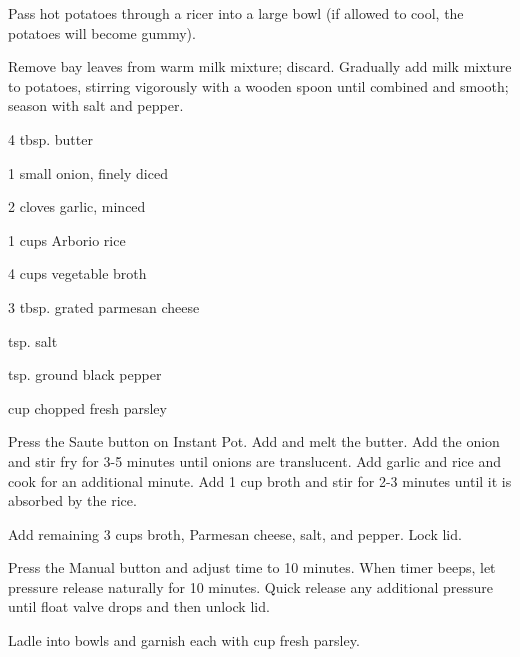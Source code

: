 \documentclass{cookbook}
\begin{document}
Pass hot potatoes through a ricer into a large bowl (if allowed to cool, the potatoes will become gummy).

Remove bay leaves from warm milk mixture; discard. Gradually add milk mixture to potatoes, stirring vigorously with a wooden spoon until combined and smooth; season with salt and pepper.


\begin{ingredients}
    \item 4 tbsp. butter
    \item 1 small onion, finely diced
    \item 2 cloves garlic, minced
    \item 1  cups Arborio rice
    \item 4 cups vegetable broth
    \item 3 tbsp. grated parmesan cheese
    \item {} tsp. salt
    \item {} tsp. ground black pepper
    \item {} cup chopped fresh parsley   
\end{ingredients}

Press the Saute button on Instant Pot. Add and melt the butter. Add the onion and stir fry for 3-5 minutes until onions are translucent. Add garlic and rice and cook for an additional minute. Add 1 cup broth and stir for 2-3 minutes until it is absorbed by the rice.

Add remaining 3 cups broth, Parmesan cheese, salt, and pepper. Lock lid.

Press the Manual button and adjust time to 10 minutes. When timer beeps, let pressure release naturally for 10 minutes. Quick release any additional pressure until float valve drops and then unlock lid.

Ladle into bowls and garnish each with  cup fresh parsley.
\end{document}
